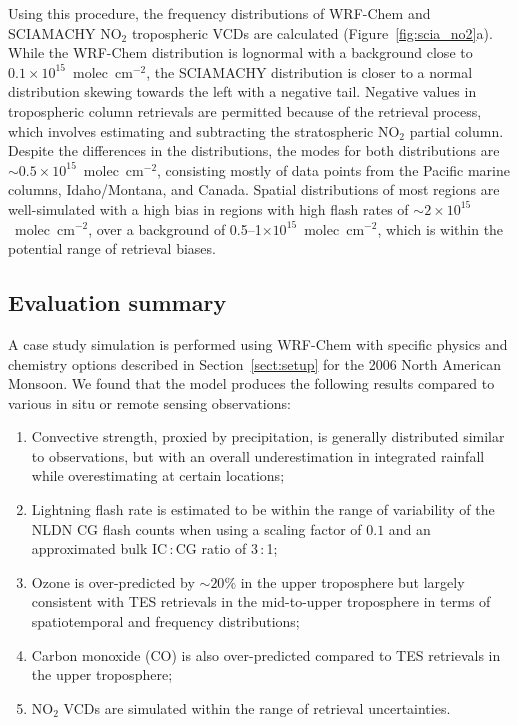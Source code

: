 Using this procedure, the frequency distributions of WRF-Chem and SCIAMACHY
NO$_2$ tropospheric VCDs are calculated (Figure~\ref{fig:scia_no2}a). While the
WRF-Chem distribution is lognormal with a background close to
$0.1\times10^{15}$~molec~cm$^{-2}$, the SCIAMACHY distribution is closer to a
normal distribution skewing towards the left with a negative tail. Negative values
in tropospheric column retrievals are permitted because of the retrieval process,
which involves estimating and subtracting the stratospheric NO$_2$ partial column.
Despite the differences in the distributions, the modes for both distributions are
$\sim0.5\times10^{15}$~molec~cm$^{-2}$, consisting mostly of data points from
the Pacific marine columns, Idaho/Montana, and Canada. Spatial distributions of
most regions are well-simulated with a high bias in regions with high flash
rates of $\sim2\times10^{15}$~molec~cm$^{-2}$, over a background of 0.5--1$\times 10^{15}$~molec~cm$^{-2}$,
which is within the potential range of retrieval biases.

\subsection{Evaluation summary}\label{sect:val/summary}

A case study simulation is performed using WRF-Chem with specific physics and
chemistry options described in Section~\ref{sect:setup} for the 2006 North American
Monsoon. We found that the model produces the following results compared to
various in situ or remote sensing observations:
\begin{enumerate}
\item Convective strength, proxied by precipitation, is generally distributed similar to observations, but
with an overall underestimation in integrated rainfall while overestimating at certain locations;
\item Lightning flash rate is estimated to be within the range of variability of the NLDN CG flash counts when using
a scaling factor of $0.1$ and an approximated bulk IC\,:\,CG ratio of 3\,:\,1;
\item Ozone is over-predicted by $\sim20\%$ in the upper troposphere but largely consistent
with TES retrievals in the mid-to-upper troposphere in terms of spatiotemporal and frequency distributions;
\item Carbon monoxide (CO) is also over-predicted compared to TES retrievals in the upper troposphere;
\item NO$_2$ VCDs are simulated within the range of retrieval uncertainties.
\end{enumerate}

